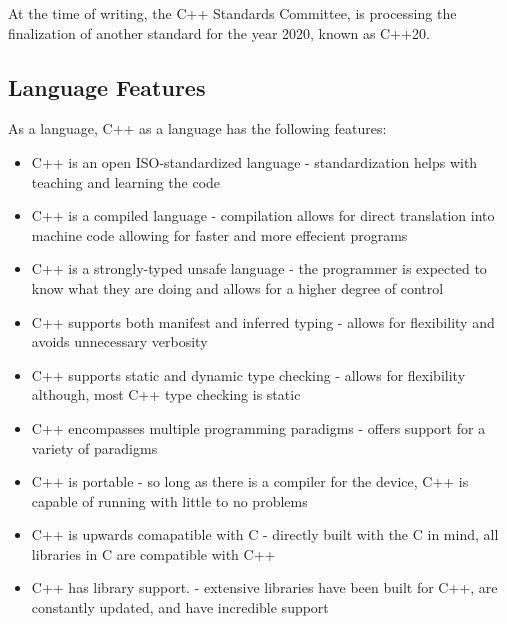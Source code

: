 \documentclass[12pt]{article}
\begin{document}
At the time of writing, the C++ Standards Committee, is processing the finalization of another standard for the year 2020, known as C++20.

\subsection{Language Features}
As a language, C++ as a language has the following features:

\begin{itemize}
  \item C++ is an open ISO-standardized language - standardization helps with teaching and learning the code
  \item C++ is a compiled language - compilation allows for direct translation into machine code allowing for faster and more effecient programs
  \item C++ is a strongly-typed unsafe language - the programmer is expected to know what they are doing and allows for a higher degree of control
  \item C++ supports both manifest and inferred typing - allows for flexibility and avoids unnecessary verbosity
  \item C++ supports static and dynamic type checking - allows for flexibility although, most C++ type checking is static
  \item C++ encompasses multiple programming paradigms - offers support for a variety of paradigms
  \item C++ is portable - so long as there is a compiler for the device, C++ is capable of running with little to no problems
  \item C++ is upwards comapatible with C - directly built with the C in mind, all libraries in C are compatible with C++
  \item C++ has library support. - extensive libraries have been built for C++, are constantly updated, and have incredible support
\end{itemize}
\end{document}
